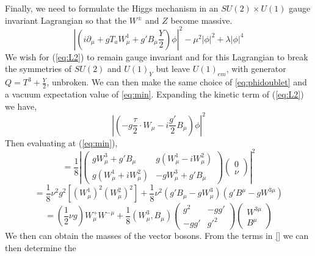 Finally, we need to formulate the Higgs mechanism in an $SU(2)\times U(1)$ 
gauge invariant Lagrangian so that the $W^{\pm}$ and $Z$ become massive. 
\begin{equation} %
\left| \left( i\partial_{\mu}+gT_{a}W_{\mu}^{1}+g'B_{\mu}\frac{Y}{2}\right)\phi \right|^{2} - \mu^{2}\left| \phi \right| ^{2}
+\lambda\left| \phi \right| ^{4}
\label{eq:L2}
\end{equation}
We wish for (\ref{eq:L2}) to remain gauge invariant and 
for this Lagrangian to break the symmetries of $SU(2)$ and $U(1)_{Y}$
but leave $U(1)_{em}$, with generator $Q=T^{3}+\frac{Y}{2}$, unbroken. 
We can then make the same choice of \ref{eq:phidoublet} and a vacuum 
expectation value of \ref{eq:min}.
Expanding the kinetic term of (\ref{eq:L2}) we have,
\begin{equation}
\left| \left(-g\frac{\tau}{2}\cdot W_{\mu}-i\frac{g'}{2}B_{\mu}\right)\phi\right|^{2}
\end{equation}
Then evaluating at (\ref{eq:min}),
\begin{equation}
=\frac{1}{8}\left|
\begin{pmatrix}
		gW_{\mu}^{3}+g'B_{\mu} & g(W_{\mu}^{1}-iW_{\mu}^{2})\\
		g(W_{\mu}^{1}+iW_{\mu}^{2}) & -gW_{\mu}^{3}+g'B_{\mu}
\end{pmatrix}
\begin{pmatrix}
0\\
\nu
\end{pmatrix}
\right|^{2}
\end{equation}
\begin{equation}
=
\frac{1}{8}\nu^{2}g^{2}\left[\left(W_{\mu}^{1} \right)^{2} \left(W_{\mu}^{2} \right)^{2} \right]
+\frac{1}{8}\nu^{2}(g'B_{\mu}-gW_{\mu}^{3})(g'B^{\mu}-gW^{3\mu}) 
\end{equation}
\begin{equation}
=(\frac{1}{2}\nu g)W_{\mu}^{+}W^{-\mu}+\frac{1}{8}(W_{\mu}^{3},B_{\mu})
\begin{pmatrix}
g^{2} & -gg'\\
-gg'  & g'^{2}
\end{pmatrix}
\begin{pmatrix}
W^{3\mu}\\
B^{\mu}
\end{pmatrix}
\end{equation}
We then can obtain the masses of the vector bosons.
From the terms in \ref{} we can then determine the 

